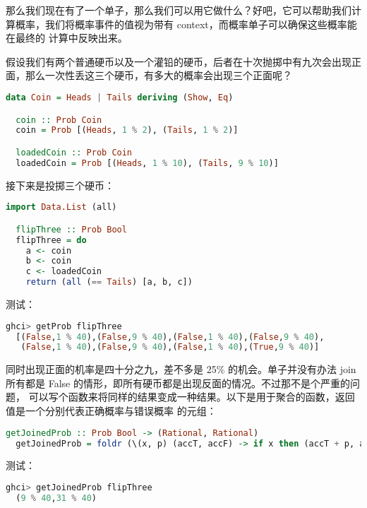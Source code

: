 \documentclass[./main.tex]{subfiles}
\begin{document}
那么我们现在有了一个单子，那么我们可以用它做什么？好吧，它可以帮助我们计算概率，我们将概率事件的值视为带有 context，而概率单子可以确保这些概率能在最终的
计算中反映出来。

假设我们有两个普通硬币以及一个灌铅的硬币，后者在十次抛掷中有九次会出现正面，那么一次性丢这三个硬币，有多大的概率会出现三个正面呢？

\begin{lstlisting}[language=Haskell]
  data Coin = Heads | Tails deriving (Show, Eq)

  coin :: Prob Coin
  coin = Prob [(Heads, 1 % 2), (Tails, 1 % 2)]

  loadedCoin :: Prob Coin
  loadedCoin = Prob [(Heads, 1 % 10), (Tails, 9 % 10)]
\end{lstlisting}

接下来是投掷三个硬币：

\begin{lstlisting}[language=Haskell]
  import Data.List (all)

  flipThree :: Prob Bool
  flipThree = do
    a <- coin
    b <- coin
    c <- loadedCoin
    return (all (== Tails) [a, b, c])
\end{lstlisting}

测试：

\begin{lstlisting}[language=Haskell]
  ghci> getProb flipThree
  [(False,1 % 40),(False,9 % 40),(False,1 % 40),(False,9 % 40),
   (False,1 % 40),(False,9 % 40),(False,1 % 40),(True,9 % 40)]
\end{lstlisting}

同时出现正面的机率是四十分之九，差不多是 25\% 的机会。单子并没有办法 join 所有都是 False 的情形，即所有硬币都是出现反面的情况。不过那不是个严重的问题，
可以写个函数来将同样的结果变成一种结果。以下是用于聚合的函数，返回值是一个分别代表正确概率与错误概率
的元组：

\begin{lstlisting}[language=Haskell]
  getJoinedProb :: Prob Bool -> (Rational, Rational)
  getJoinedProb = foldr (\(x, p) (accT, accF) -> if x then (accT + p, accF) else (accT, accF + p)) (0, 0) . getProb
\end{lstlisting}

测试：

\begin{lstlisting}[language=Haskell]
  ghci> getJoinedProb flipThree
  (9 % 40,31 % 40)
\end{lstlisting}
\end{document}
